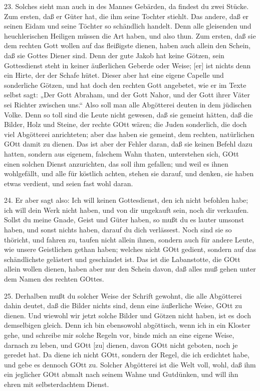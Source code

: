 23. Solches sieht man auch in des Mannes Gebärden, da findest du zwei Stücke. Zum ersten, daß er Güter hat, die ihm seine Tochter stiehlt. Das andere, daß er seinen Eidam und seine Töchter so schändlich handelt. Denn alle gleisenden und heuchlerischen Heiligen müssen die Art haben, und also thun. Zum ersten, daß sie dem rechten Gott wollen auf das fleißigste dienen, haben auch allein den Schein, daß sie Gottes Diener sind. Denn der gute Jakob hat keine Götzen, sein Gottesdienst steht in keiner äußerlichen Geberde oder Weise; [er] ist nichts denn ein Hirte, der der Schafe hütet. Dieser aber hat eine eigene Capelle und sonderliche Götzen, und hat doch den rechten Gott angebetet, wie er im Texte selbst sagt: „Der Gott Abraham, und der Gott Nahor, und der Gott
ihrer Väter sei Richter zwischen uns.“ Also soll man alle Abgötterei deuten in dem jüdischen Volke. Denn so toll sind die Leute nicht gewesen, daß sie gemeint hätten, daß die Bilder, Holz und Steine, der rechte GOtt wären; die Juden sonderlich, die doch viel Abgötterei anrichteten; aber das haben sie gemeint, dem rechten, natürlichen GOtt damit zu dienen. Das ist aber der Fehler daran, daß sie keinen Befehl dazu hatten, sondern aus eigenem, falschem Wahn thaten, unterstehen sich, GOtt einen solchen Dienst anzurichten, das soll ihm gefallen; und weil es ihnen wohlgefällt, und alle für köstlich achten, stehen sie darauf, und denken, sie haben etwas verdient, und seien fast wohl daran.

24. Er aber sagt also: Ich will keinen Gottesdienst, den ich nicht befohlen habe; ich will dein Werk nicht haben, und von dir ungekauft sein, noch dir verkaufen. Sollst du meine Gnade, Geist und Güter haben, so mußt du es lauter umsonst haben, und sonst nichts haben, darauf du dich verlässest. Noch sind sie so thöricht, und fahren zu, taufen nicht allein ihnen, sondern auch für andere Leute, wie unsere Geistlichen gethan haben; welches nicht GOtt gedient, sondern auf das schändlichste gelästert und geschändet ist. Das ist die Labanstotte, die GOtt allein wollen dienen, haben aber nur den Schein davon, daß alles muß gehen unter dem Namen des rechten GOttes.

25. Derhalben mußt du solcher Weise der Schrift gewohnt, die alle Abgötterei dahin deutet, daß die Bilder nichts sind, denn eine äußerliche Weise, GOtt zu dienen. Und wiewohl wir jetzt solche Bilder und Götzen nicht haben, ist es doch demselbigen gleich. Denn ich bin ebensowohl abgöttisch, wenn ich in ein Kloster gehe, und schreibe mir solche Regeln vor, binde mich an eine eigene Weise, darnach zu leben, und GOtt [zu] dienen, davon GOtt nicht geboten, noch je geredet hat. Da diene ich nicht GOtt, sondern der Regel, die ich erdichtet habe, und gebe es dennoch GOtt zu. Solcher Abgötterei ist die Welt voll, wohl, daß ihm ein jeglicher GOtt abmalt nach seinem Wahne und Gutdünken, und will ihn ehren mit selbsterdachtem Dienst.

